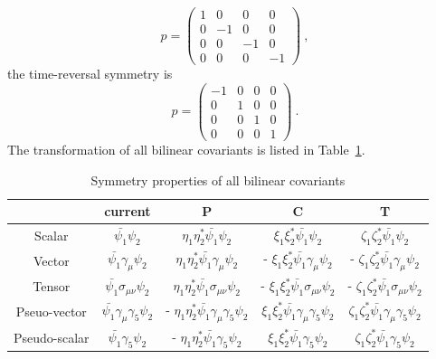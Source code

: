 \begin{equation}
\label{eqn:parityMatrix}
p = \left(
  \begin{array}{cccc}
    1 & 0 & 0 & 0 \\
    0 & -1 & 0 & 0 \\
    0 & 0 & -1 & 0 \\
    0 & 0 & 0 & -1 
  \end{array}
  \right) ~,
\end{equation}
the time-reversal symmetry is
\begin{equation}
\label{eqn:TMatrix}
p = \left(
  \begin{array}{cccc}
    -1 & 0 & 0 & 0 \\
    0 & 1 & 0 & 0 \\
    0 & 0 & 1 & 0 \\
    0 & 0 & 0 & 1 
  \end{array}
  \right) ~.
\end{equation}
The transformation of all bilinear covariants is listed in
Table~\ref{tab:transformation}.
\begin{table}[h!]
  \label{tab:transformation}
  \begin{center}
    \renewcommand{\arraystretch}{2}
\begin{tabular} {| c || c | c | c | c |} 
  \hline
  & current & P & C & T \\ \hline
  \hline
  Scalar & $\bar{\psi_1} \psi_2$ & $\eta_1 \eta_2^* \bar{\psi_1}\psi_2$ &  $\xi_1 \xi_2^* \bar{\psi_1}\psi_2$ &  $\zeta_1 \zeta_2^* \bar{\psi_1}\psi_2$ \\ \hline
  Vector & $\bar{\psi_1}\gamma_\mu \psi_2$ &  $\eta_1 \eta_2^* \bar{\psi_1}\gamma_\mu \psi_2$ & - $\xi_1 \xi_2^* \bar{\psi_1}\gamma_\mu \psi_2$ & - $\zeta_1 \zeta_2^* \bar{\psi_1}\gamma_\mu \psi_2$ \\ \hline
  Tensor &  $\bar{\psi_1} \sigma_{\mu \nu} \psi_2$ &   $\eta_1 \eta_2^* \bar{\psi_1} \sigma_{\mu \nu} \psi_2$ & - $\xi_1 \xi_2^* \bar{\psi_1} \sigma_{\mu \nu} \psi_2$ &  - $\zeta_1 \zeta_2^* \bar{\psi_1} \sigma_{\mu \nu} \psi_2$ \\ \hline
  Pseuo-vector & $\bar{\psi_1} \gamma_{\mu}\gamma_5 \psi_2$ & - $\eta_1 \eta_2^* \bar{\psi_1} \gamma_{\mu}\gamma_5 \psi_2$ & $\xi_1 \xi_2^* \bar{\psi_1} \gamma_{\mu}\gamma_5 \psi_2$ &  $\zeta_1 \zeta_2^* \bar{\psi_1} \gamma_{\mu}\gamma_5 \psi_2$ \\ \hline
  Pseudo-scalar & $\bar{\psi_1} \gamma_5 \psi_2$ & - $\eta_1 \eta_2^*\bar{\psi_1} \gamma_5 \psi_2$ & $\xi_1 \xi_2^*\bar{\psi_1} \gamma_5 \psi_2$ & $\zeta_1 \zeta_2^*\bar{\psi_1} \gamma_5 \psi_2$ \\\hline
\end{tabular}
\caption{Symmetry properties of all bilinear covariants}
\end{center}
\end{table}


